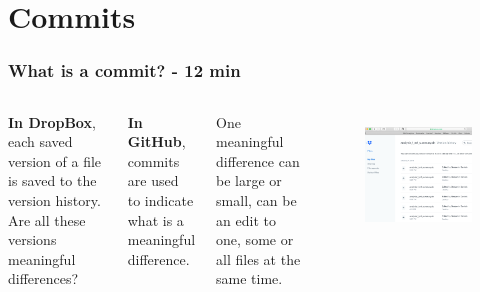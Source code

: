 \documentclass[aspectratio=169]{beamer} %
\begin{document}
\section{Commits}

\begin{frame}
	\frametitle{What is a commit? - 12 min}

	\begin{columns}[c]

		\textbf{In DropBox}, each saved version of a file is saved to the version history. Are all these versions meaningful differences?

		\vspace{.35cm}

		\textbf{In GitHub}, commits are used to indicate what is a meaningful difference.

		\vspace{.35cm}

		One meaningful difference can be large or small, can be an edit to one, some or all files at the same time.

		\begin{figure}
			\centering
			\includegraphics[width=1\linewidth]{../../Common-Resources/img/dropbox_versioncontrol}
			\label{fig:dropboxversioncontrol}
		\end{figure}

	\end{columns}
\end{frame}
\end{document}
